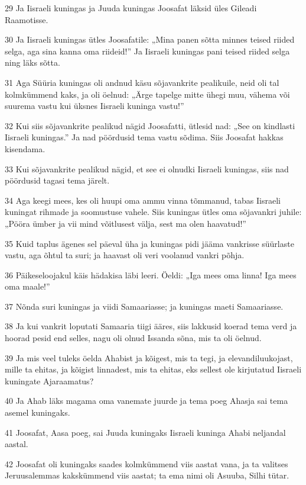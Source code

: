\par 29 Ja Iisraeli kuningas ja Juuda kuningas Joosafat läksid üles Gileadi Raamotisse.
\par 30 Ja Iisraeli kuningas ütles Joosafatile: „Mina panen sõtta minnes teised riided selga, aga sina kanna oma riideid!” Ja Iisraeli kuningas pani teised riided selga ning läks sõtta.
\par 31 Aga Süüria kuningas oli andnud käsu sõjavankrite pealikuile, neid oli tal kolmkümmend kaks, ja oli öelnud: „Ärge tapelge mitte ühegi muu, vähema või suurema vastu kui üksnes Iisraeli kuninga vastu!”
\par 32 Kui siis sõjavankrite pealikud nägid Joosafatti, ütlesid nad: „See on kindlasti Iisraeli kuningas.” Ja nad pöördusid tema vastu sõdima. Siis Joosafat hakkas kisendama.
\par 33 Kui sõjavankrite pealikud nägid, et see ei olnudki Iisraeli kuningas, siis nad pöördusid tagasi tema järelt.
\par 34 Aga keegi mees, kes oli huupi oma ammu vinna tõmmanud, tabas Iisraeli kuningat rihmade ja soomustuse vahele. Siis kuningas ütles oma sõjavankri juhile: „Pööra ümber ja vii mind võitlusest välja, sest ma olen haavatud!”
\par 35 Kuid taplus ägenes sel päeval üha ja kuningas pidi jääma vankrisse süürlaste vastu, aga õhtul ta suri; ja haavast oli veri voolanud vankri põhja.
\par 36 Päikeseloojakul käis hädakisa läbi leeri. Öeldi: „Iga mees oma linna! Iga mees oma maale!”
\par 37 Nõnda suri kuningas ja viidi Samaariasse; ja kuningas maeti Samaariasse.
\par 38 Ja kui vankrit loputati Samaaria tiigi ääres, siis lakkusid koerad tema verd ja hoorad pesid end selles, nagu oli olnud Issanda sõna, mis ta oli öelnud.
\par 39 Ja mis veel tuleks öelda Ahabist ja kõigest, mis ta tegi, ja elevandiluukojast, mille ta ehitas, ja kõigist linnadest, mis ta ehitas, eks sellest ole kirjutatud Iisraeli kuningate Ajaraamatus?
\par 40 Ja Ahab läks magama oma vanemate juurde ja tema poeg Ahasja sai tema asemel kuningaks.
\par 41 Joosafat, Aasa poeg, sai Juuda kuningaks Iisraeli kuninga Ahabi neljandal aastal.
\par 42 Joosafat oli kuningaks saades kolmkümmend viis aastat vana, ja ta valitses Jeruusalemmas kakskümmend viis aastat; ta ema nimi oli Asuuba, Silhi tütar.
